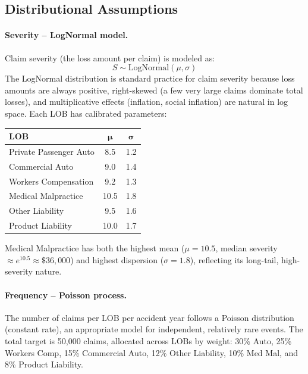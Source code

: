 \subsection{Distributional Assumptions}

\paragraph{Severity -- LogNormal model.}
Claim severity (the loss amount per claim) is modeled as:
\begin{equation}
  S \sim \mathrm{LogNormal}(\mu, \sigma)
  \label{eq:lognormal-severity}
\end{equation}
The LogNormal distribution is standard practice for claim severity because
loss amounts are always positive, right-skewed (a few very large claims
dominate total losses), and multiplicative effects (inflation, social
inflation) are natural in log space.  Each LOB has calibrated parameters:

\begin{center}
\begin{tabular}{lcc}
\toprule
\textbf{LOB} & $\boldsymbol{\mu}$ & $\boldsymbol{\sigma}$ \\
\midrule
Private Passenger Auto  & 8.5  & 1.2 \\
Commercial Auto         & 9.0  & 1.4 \\
Workers Compensation    & 9.2  & 1.3 \\
Medical Malpractice     & 10.5 & 1.8 \\
Other Liability         & 9.5  & 1.6 \\
Product Liability       & 10.0 & 1.7 \\
\bottomrule
\end{tabular}
\end{center}

Medical Malpractice has both the highest mean ($\mu = 10.5$, median severity
$\approx e^{10.5} \approx \$36{,}000$) and highest dispersion ($\sigma = 1.8$),
reflecting its long-tail, high-severity nature.

\paragraph{Frequency -- Poisson process.}
The number of claims per LOB per accident year follows a Poisson distribution
(constant rate), an appropriate model for independent, relatively rare events.
The total target is 50,000 claims, allocated across LOBs by weight:
30\% Auto, 25\% Workers Comp, 15\% Commercial Auto, 12\% Other Liability,
10\% Med Mal, and 8\% Product Liability.

